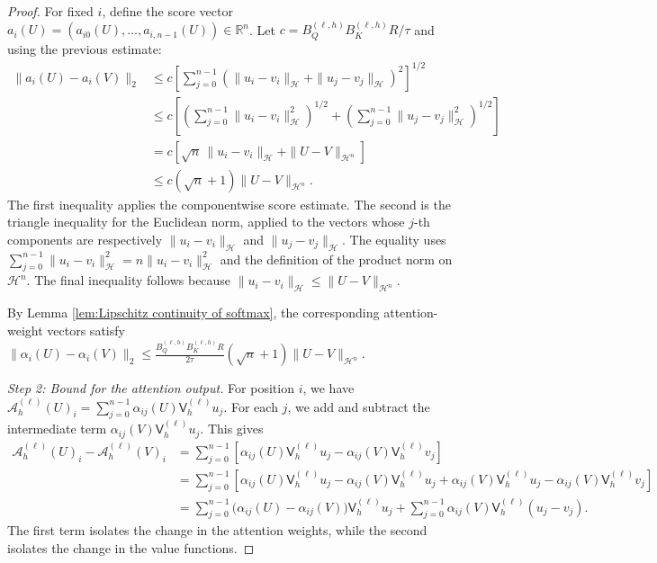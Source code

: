 \begin{proof}
For fixed \(i\), define the score vector \(a_i(U)=(a_{i0}(U),\ldots,a_{i,n-1}(U))\in\mathbb R^n\). Let \(c={B_Q^{(\ell,h)}B_K^{(\ell,h)}R}/{\tau}\) and using the previous estimate:
\[
\begin{aligned}
\|a_i(U)-a_i(V)\|_2
&\leqslant c\left[\sum_{j=0}^{n-1}\left(\|u_i-v_i\|_{\mathcal H}+\|u_j-v_j\|_{\mathcal H}\right)^2\right]^{1/2}\\
&\leqslant c\left[\left(\sum_{j=0}^{n-1}\|u_i-v_i\|_{\mathcal H}^2\right)^{1/2}+\left(\sum_{j=0}^{n-1}\|u_j-v_j\|_{\mathcal H}^2\right)^{1/2}\right]\\
&=c\left[\sqrt n\,\|u_i-v_i\|_{\mathcal H}+\|U-V\|_{\mathcal H^n}\right]\\
&\leqslant c(\sqrt n+1)\|U-V\|_{\mathcal H^n}.
\end{aligned}
\]
The first inequality applies the componentwise score estimate. The second is the triangle inequality for the Euclidean norm, applied to the vectors whose \(j\)-th components are respectively \(\|u_i-v_i\|_{\mathcal H}\) and \(\|u_j-v_j\|_{\mathcal H}\). The equality uses \(\sum_{j=0}^{n-1}\|u_i-v_i\|_{\mathcal H}^2=n\|u_i-v_i\|_{\mathcal H}^2\) and the definition of the product norm on \(\mathcal H^n\). The final inequality follows because \(\|u_i-v_i\|_{\mathcal H}\leqslant\|U-V\|_{\mathcal H^n}\).

By Lemma \ref{lem:Lipschitz continuity of softmax}, the corresponding attention-weight vectors satisfy \(\|\alpha_i(U)-\alpha_i(V)\|_2\leqslant\frac{B_Q^{(\ell,h)}B_K^{(\ell,h)}R}{2\tau}(\sqrt n+1)\|U-V\|_{\mathcal H^n}\).

\textit{Step 2: Bound for the attention output.} For position \(i\), we have \(\mathcal A_h^{(\ell)}(U)_i=\sum_{j=0}^{n-1}\alpha_{ij}(U)\mathsf V_h^{(\ell)}u_j\). For each \(j\), we add and subtract the intermediate term \(\alpha_{ij}(V)\mathsf V_h^{(\ell)}u_j\). This gives
\[
\begin{aligned}
\mathcal A_h^{(\ell)}(U)_i-\mathcal A_h^{(\ell)}(V)_i
&=
\sum_{j=0}^{n-1}
\left[
\alpha_{ij}(U)\mathsf V_h^{(\ell)}u_j
-
\alpha_{ij}(V)\mathsf V_h^{(\ell)}v_j
\right]\\
&=
\sum_{j=0}^{n-1}
\left[
\alpha_{ij}(U)\mathsf V_h^{(\ell)}u_j
-
\alpha_{ij}(V)\mathsf V_h^{(\ell)}u_j
+
\alpha_{ij}(V)\mathsf V_h^{(\ell)}u_j
-
\alpha_{ij}(V)\mathsf V_h^{(\ell)}v_j
\right]\\
&=
\sum_{j=0}^{n-1}
\bigl(
\alpha_{ij}(U)-\alpha_{ij}(V)
\bigr)
\mathsf V_h^{(\ell)}u_j
+
\sum_{j=0}^{n-1}
\alpha_{ij}(V)
\mathsf V_h^{(\ell)}(u_j-v_j).
\end{aligned}
\]
The first term isolates the change in the attention weights, while the second isolates the change in the value functions.


\end{proof}
